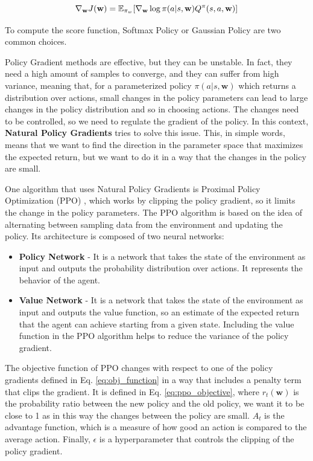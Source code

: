 \begin{equation} \label{eq:policy_gradient}
    \nabla_{\textbf{w}} J(\textbf{w}) = \operatorname{\mathbb{E}}_{\pi_w}[\nabla_{\textbf{w}} \log \pi(a|s, \textbf{w}) Q^{\pi}(s, a, \textbf{w})]
\end{equation}


To compute the score function, Softmax Policy or Gaussian Policy are two common choices.

Policy Gradient methods are effective, but they can be unstable.
In fact, they need a high amount of samples to converge, and they can suffer from high variance, meaning that, for a parameterized policy $\pi(a|s, \textbf{w})$ which returns a distribution over actions, small changes in the policy parameters can lead to large changes in the policy distribution and so in choosing actions.
The changes need to be controlled, so we need to regulate the gradient of the policy.
In this context, \textbf{Natural Policy Gradients} \citep{kakade2001natural} tries to solve this issue.
This, in simple words, means that we want to find the direction in the parameter space that maximizes the expected return, but we want to do it in a way that the changes in the policy are small.


One algorithm that uses Natural Policy Gradients is Proximal Policy Optimization (PPO) \citep{schulman2017proximal}, which works by clipping the policy gradient, so it limits the change in the policy parameters.
The PPO algorithm is based on the idea of alternating between sampling data from the environment and updating the policy.
Its architecture is composed of two neural networks:

\begin{itemize}
    \item \textbf{Policy Network} - It is a network that takes the state of the environment as input and outputs the probability distribution over actions.
    It represents the behavior of the agent.
    \item \textbf{Value Network} - It is a network that takes the state of the environment as input and outputs the value function, so an estimate of the expected return that the agent can achieve starting from a given state.
    Including the value function in the PPO algorithm helps to reduce the variance of the policy gradient.
\end{itemize}

The objective function of PPO changes with respect to one of the policy gradients defined in Eq. \ref{eq:obj_function} in a way that includes a penalty term that clips the gradient.
It is defined in Eq. \ref{eq:ppo_objective}, where $r_t(\textbf{w})$ is the probability ratio between the new policy and the old policy, we want it to be close to 1 as in this way the changes between the policy are small. 
$A_t$ is the advantage function, which is a measure of how good an action is compared to the average action.
Finally, $\epsilon$ is a hyperparameter that controls the clipping of the policy gradient.

